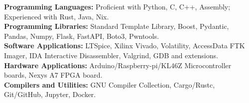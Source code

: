 \textbf{Programming Languages:} Proficient with Python, C, C++, Assembly; Experienced with Rust, Java, Nix.\\
\textbf{Programming Libraries:} Standard Template Library, Boost, Pydantic, Pandas, Numpy, Flask, FastAPI, Boto3, Pwntools.\\
\textbf{Software Applications:} LTSpice, Xilinx Vivado, Volatility, AccessData FTK Imager, IDA Interactive Disassembler, Valgrind, GDB and extensions.\\
\textbf{Hardware Applications:} Arduino/Raspberry-pi/KL46Z Microcontroller boards, Nexys A7 FPGA board.\\
\textbf{Compilers and Utilities:} GNU Compiler Collection, Cargo/Rustc, Git/GitHub, Jupyter, Docker.
